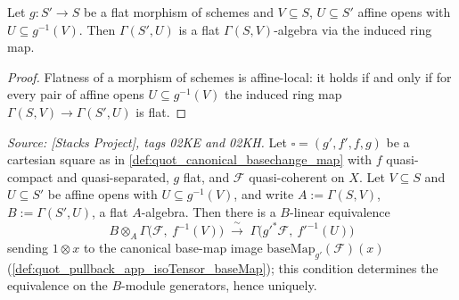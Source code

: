 \begin{lemma}
  \label{lem:quot_flat_gamma_appLE}
  \leanok
  Let \(g : S' \to S\) be a flat morphism of schemes and \(V \subseteq S\),
  \(U \subseteq S'\) affine opens with \(U \subseteq g^{-1}(V)\). Then
  \(\Gamma(S', U)\) is a flat \(\Gamma(S, V)\)-algebra via the induced ring
  map.
\end{lemma}
\begin{proof}\leanok
  Flatness of a morphism of schemes is affine-local: it holds if and only
  if for every pair of affine opens \(U \subseteq g^{-1}(V)\) the induced
  ring map \(\Gamma(S, V) \to \Gamma(S', U)\) is flat.
\end{proof}

\begin{theorem}
  \label{thm:quot_pullback_baseMap_sectionEquiv_qc}
  \leanok
  \textit{Source: [Stacks Project], tags 02KE and 02KH.}
  Let \(\square = (g', f', f, g)\) be a cartesian square as in
  \cref{def:quot_canonical_basechange_map} with \(f\) quasi-compact and
  quasi-separated, \(g\) flat, and \(\mathcal F\) quasi-coherent on \(X\).
  Let \(V \subseteq S\) and \(U \subseteq S'\) be affine opens with
  \(U \subseteq g^{-1}(V)\), and write \(A := \Gamma(S, V)\),
  \(B := \Gamma(S', U)\), a flat \(A\)-algebra. Then there is a
  \(B\)-linear equivalence
  \[
    B \otimes_A \Gamma\bigl(\mathcal F,\ f^{-1}(V)\bigr)
    \;\xrightarrow{\ \sim\ }\;
    \Gamma\bigl(g'^* \mathcal F,\ f'^{-1}(U)\bigr)
  \]
  sending \(1 \otimes x\) to the canonical base-map image
  \(\mathrm{baseMap}_{g'}(\mathcal F)(x)\)
  (\cref{def:quot_pullback_app_isoTensor_baseMap}); this condition
  determines the equivalence on the \(B\)-module generators, hence
  uniquely.
\end{theorem}
